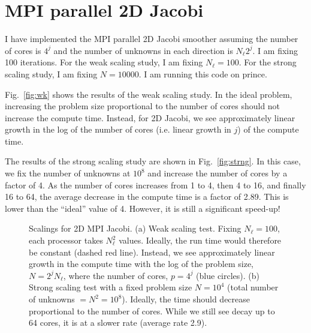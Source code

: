 \documentclass[a4paper]{article}
\begin{document}
\section{MPI parallel 2D Jacobi}
I have implemented the MPI parallel 2D Jacobi smoother assuming the number of cores is $4^j$ and the number of unknowns in each direction is $N_\ell 2^j$. I am fixing 100 iterations. For the weak scaling study, I am fixing $N_\ell = 100$. For the strong scaling study, I am fixing $N=10000$. I am running this code on prince. 

Fig.\ \ref{fig:wk} shows the results of the weak scaling study. In the ideal problem, increasing the problem size proportional to the number of cores should not increase the compute time. Instead, for 2D Jacobi, we see approximately linear growth in the log of the number of cores (i.e. linear growth in $j$) of the compute time. 

The results of the strong scaling study are shown in Fig.\ \ref{fig:strng}. In this case, we fix the number of unknowns at $10^8$ and increase the number of cores by a factor of 4. As the number of cores increases from 1 to 4, then 4 to 16, and finally 16 to 64, the average decrease in the compute time is a factor of 2.89. This is lower than the ``ideal'' value of 4. However, it is still a significant speed-up!

\begin{figure}
\centering 
{}
\caption{Scalings for 2D MPI Jacobi. (a) Weak scaling test. Fixing $N_{\ell}=100$, each processor takes $N_\ell^2$ values. Ideally, the run time would therefore be constant (dashed red line). Instead, we see approximately linear growth in the compute time with the log of the problem size, $N=2^j N_\ell$, where the number of cores, $p=4^j$ (blue circles). (b) Strong scaling test with a fixed problem size $N=10^4$ (total number of unknowns $=N^2=10^8$). Ideally, the time should decrease proportional to the number of cores. While we still see decay up to 64 cores, it is at a slower rate (average rate 2.9).  } 
\end{figure}
\end{document}
